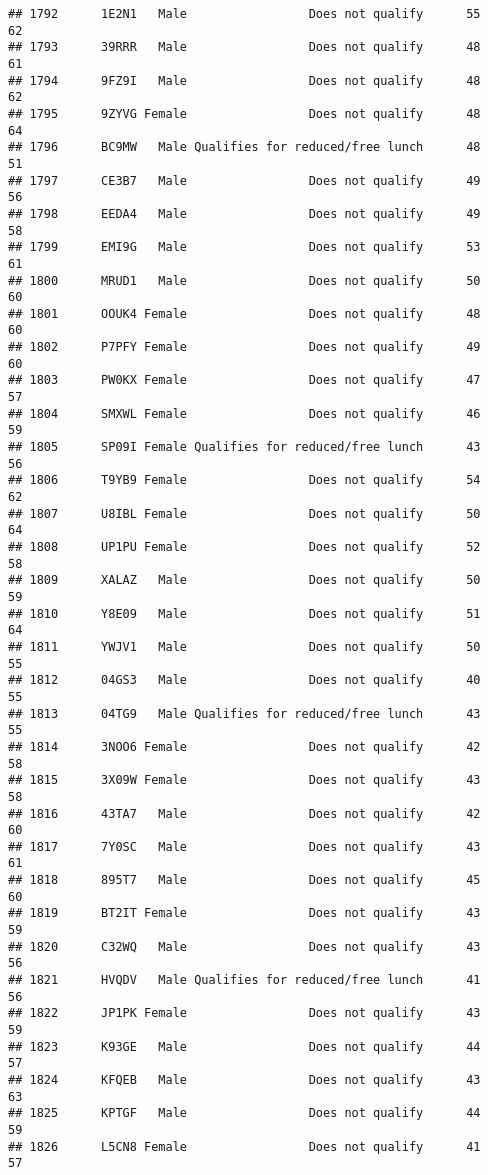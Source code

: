 \documentclass[
]{article}
\begin{document}
\begin{verbatim}
## 1792      1E2N1   Male                 Does not qualify      55       62
## 1793      39RRR   Male                 Does not qualify      48       61
## 1794      9FZ9I   Male                 Does not qualify      48       62
## 1795      9ZYVG Female                 Does not qualify      48       64
## 1796      BC9MW   Male Qualifies for reduced/free lunch      48       51
## 1797      CE3B7   Male                 Does not qualify      49       56
## 1798      EEDA4   Male                 Does not qualify      49       58
## 1799      EMI9G   Male                 Does not qualify      53       61
## 1800      MRUD1   Male                 Does not qualify      50       60
## 1801      OOUK4 Female                 Does not qualify      48       60
## 1802      P7PFY Female                 Does not qualify      49       60
## 1803      PW0KX Female                 Does not qualify      47       57
## 1804      SMXWL Female                 Does not qualify      46       59
## 1805      SP09I Female Qualifies for reduced/free lunch      43       56
## 1806      T9YB9 Female                 Does not qualify      54       62
## 1807      U8IBL Female                 Does not qualify      50       64
## 1808      UP1PU Female                 Does not qualify      52       58
## 1809      XALAZ   Male                 Does not qualify      50       59
## 1810      Y8E09   Male                 Does not qualify      51       64
## 1811      YWJV1   Male                 Does not qualify      50       55
## 1812      04GS3   Male                 Does not qualify      40       55
## 1813      04TG9   Male Qualifies for reduced/free lunch      43       55
## 1814      3NOO6 Female                 Does not qualify      42       58
## 1815      3X09W Female                 Does not qualify      43       58
## 1816      43TA7   Male                 Does not qualify      42       60
## 1817      7Y0SC   Male                 Does not qualify      43       61
## 1818      895T7   Male                 Does not qualify      45       60
## 1819      BT2IT Female                 Does not qualify      43       59
## 1820      C32WQ   Male                 Does not qualify      43       56
## 1821      HVQDV   Male Qualifies for reduced/free lunch      41       56
## 1822      JP1PK Female                 Does not qualify      43       59
## 1823      K93GE   Male                 Does not qualify      44       57
## 1824      KFQEB   Male                 Does not qualify      43       63
## 1825      KPTGF   Male                 Does not qualify      44       59
## 1826      L5CN8 Female                 Does not qualify      41       57

\end{verbatim}
\end{document}
